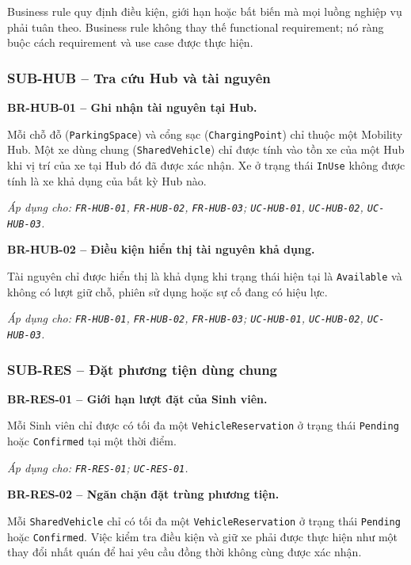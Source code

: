 Business rule quy định điều kiện, giới hạn hoặc bất biến mà mọi luồng nghiệp vụ phải tuân theo. Business rule không thay thế functional requirement; nó ràng buộc cách requirement và use case được thực hiện.

\subsubsection{SUB-HUB -- Tra cứu Hub và tài nguyên}

\noindent\textbf{BR-HUB-01 -- Ghi nhận tài nguyên tại Hub.}\par
\nopagebreak[4]
Mỗi chỗ đỗ (\texttt{ParkingSpace}) và cổng sạc (\texttt{ChargingPoint}) chỉ thuộc một Mobility Hub. Một xe dùng chung (\texttt{SharedVehicle}) chỉ được tính vào tồn xe của một Hub khi vị trí của xe tại Hub đó đã được xác nhận. Xe ở trạng thái \texttt{InUse} không được tính là xe khả dụng của bất kỳ Hub nào.

\textit{Áp dụng cho: \texttt{FR-HUB-01}, \texttt{FR-HUB-02}, \texttt{FR-HUB-03};\newline
\texttt{UC-HUB-01}, \texttt{UC-HUB-02}, \texttt{UC-HUB-03}.}

\medskip
\noindent\textbf{BR-HUB-02 -- Điều kiện hiển thị tài nguyên khả dụng.}\par
\nopagebreak[4]
Tài nguyên chỉ được hiển thị là khả dụng khi trạng thái hiện tại là \texttt{Available} và không có lượt giữ chỗ, phiên sử dụng hoặc sự cố đang có hiệu lực.

\textit{Áp dụng cho: \texttt{FR-HUB-01}, \texttt{FR-HUB-02}, \texttt{FR-HUB-03};\newline
\texttt{UC-HUB-01}, \texttt{UC-HUB-02}, \texttt{UC-HUB-03}.}

\subsubsection{SUB-RES -- Đặt phương tiện dùng chung}

\noindent\textbf{BR-RES-01 -- Giới hạn lượt đặt của Sinh viên.}\par
\nopagebreak[4]
Mỗi Sinh viên chỉ được có tối đa một \texttt{VehicleReservation} ở trạng thái \texttt{Pending} hoặc \texttt{Confirmed} tại một thời điểm.

\textit{Áp dụng cho: \texttt{FR-RES-01}; \texttt{UC-RES-01}.}

\medskip
\noindent\textbf{BR-RES-02 -- Ngăn chặn đặt trùng phương tiện.}\par
\nopagebreak[4]
Mỗi \texttt{SharedVehicle} chỉ có tối đa một \texttt{VehicleReservation} ở trạng thái \texttt{Pending} hoặc \texttt{Confirmed}. Việc kiểm tra điều kiện và giữ xe phải được thực hiện như một thay đổi nhất quán để hai yêu cầu đồng thời không cùng được xác nhận.

